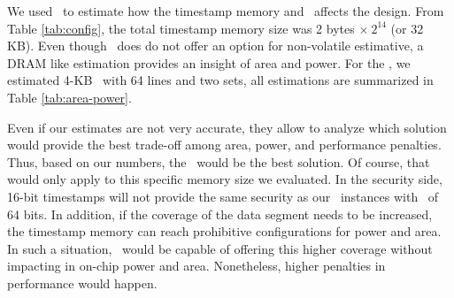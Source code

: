 We used \cacti~to estimate how the timestamp memory and \ptagcache~affects the design. From Table \ref{tab:config}, the total timestamp memory size was 2 bytes $\times~2^{14}$ (or 32 KB). Even though \cacti~does do not offer an option for non-volatile estimative, a DRAM like estimation provides an insight of area and power. For the \ptagcache, we estimated 4-KB \ptagcache~with 64 lines and two sets, all estimations are summarized in Table \ref{tab:area-power}. 



Even if our estimates are not very accurate, they allow to analyze which solution would provide the best trade-off among area, power, and performance penalties. Thus, based on our numbers, the \timestamp~would be the best solution. Of course, that would only apply to this specific memory size we evaluated. In the security side, 16-bit timestamps will not provide the same security as our \cshiamt~instances with \ptags~of 64 bits. In addition, if the coverage of the data segment needs to be increased, the timestamp memory can reach prohibitive configurations for power and area. In such a situation, \cshiamt~would be capable of offering this higher coverage without impacting in on-chip power and area. Nonetheless, higher penalties in performance would happen. 
